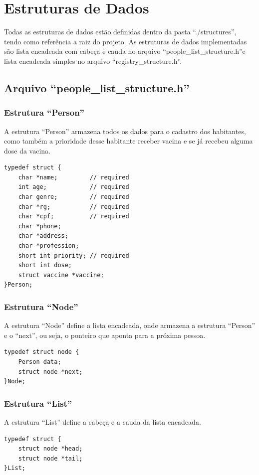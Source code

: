 \documentclass[12pt, a4paper]{article}
\newcommand{\prof}{Rômulo César Silva}
\begin{document}
\pagestyle{fancy}
\fancyfoot[L]{}
\fancyhead[L]{}
\fancyhead[R]{}

\tableofcontents
\newpage

\section{Estruturas de Dados}\label{Estruturas de Dados}
Todas as estruturas de dados estão definidas dentro da pasta ``./structures'', tendo como referência a raiz do projeto. As estruturas de dados implementadas são lista encadeada com cabeça e cauda no arquivo ``people\_list\_structure.h''e lista encadeada simples no arquivo ``registry\_structure.h''.
\subsection{Arquivo ``people\_list\_structure.h''}\label{Arquivo``peoplelist.h''}
\subsubsection{Estrutura ``Person''}\label{Estrutura ``Person''}
A estrutura ``Person'' armazena todos os dados para o cadastro dos habitantes, como também a prioridade desse habitante receber vacina e se já recebeu alguma dose da vacina.
\begin{lstlisting}
typedef struct {
    char *name;         // required
    int age;            // required
    char genre;         // required
    char *rg;           // required
    char *cpf;          // required
    char *phone;
    char *address;
    char *profession;
    short int priority; // required
    short int dose;
    struct vaccine *vaccine;
}Person;
\end{lstlisting}
\subsubsection{Estrutura ``Node''}\label{Estrutura ``Node''}
A estrutura ``Node'' define a lista encadeada, onde armazena a estrutura ``Person'' e o ``next'', ou seja, o ponteiro que aponta para a próxima pessoa.
\begin{lstlisting}
typedef struct node {
    Person data;
    struct node *next;
}Node;
\end{lstlisting}
\subsubsection{Estrutura ``List''}\label{Estrutura ``List''}
A estrutura ``List'' define a cabeça e a cauda da lista encadeada.
\begin{lstlisting}
typedef struct {
    struct node *head;
    struct node *tail;
}List;
\end{lstlisting}
\end{document}
